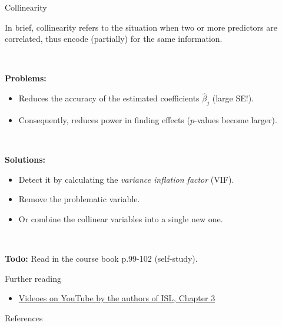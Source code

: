\documentclass[
  10pt,
  ignorenonframetext,
]{beamer}
\providecommand{\tightlist}{%
  \setlength{\itemsep}{0pt}\setlength{\parskip}{0pt}}
\begin{document}
\begin{frame}
\begin{block}{Collinearity}
\protect\hypertarget{collinearity}{}
\vspace{2mm}

In brief, collinearity refers to the situation when two or more
predictors are correlated, thus encode (partially) for the same
information.

\(~\)

\textbf{Problems:}

\begin{itemize}
\item
  Reduces the accuracy of the estimated coefficients \(\hat\beta_j\)
  (large SE!).
\item
  Consequently, reduces power in finding effects (\(p\)-values become
  larger).
\end{itemize}

\(~\)

\textbf{Solutions:}

\begin{itemize}
\item
  Detect it by calculating the \emph{variance inflation factor} (VIF).
\item
  Remove the problematic variable.
\item
  Or combine the collinear variables into a single new one.
\end{itemize}

\(~\)

\textbf{Todo:} Read in the course book p.99-102 (self-study).
\end{block}
\end{frame}

\begin{frame}{ Further reading }
\protect\hypertarget{further-reading}{}
\begin{itemize}
\tightlist
\item
  \href{https://www.youtube.com/playlist?list=PL5-da3qGB5IBSSCPANhTgrw82ws7w_or9}{Videoes
  on YouTube by the authors of ISL, Chapter 3}
\end{itemize}
\end{frame}

\begin{frame}{References}
\protect\hypertarget{references}{}
\end{frame}
\end{document}
